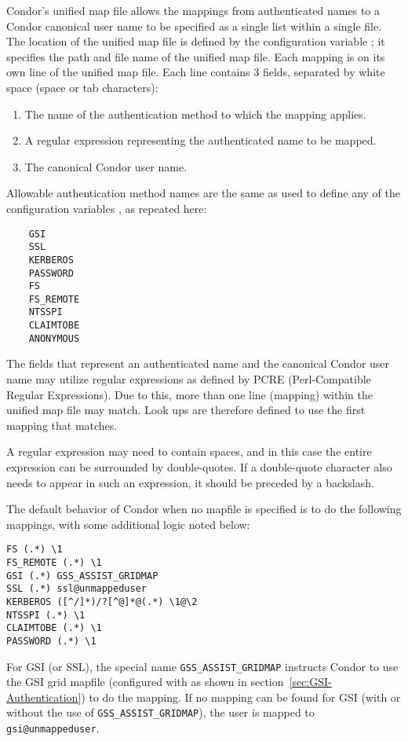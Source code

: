 Condor's unified map file allows the mappings
from authenticated names to a Condor canonical user name
to be specified as a single list within a single file. 
The location of the unified map file is defined 
by the configuration variable
; it specifies the
path and file name of the unified map file.
Each mapping is on its own line of the unified map file.
Each line contains 3 fields, separated by white space 
(space or tab characters):
\begin{enumerate}
\item{The name of the authentication method to which the mapping applies.}
\item{A regular expression representing the authenticated name
to be mapped.}
\item{The canonical Condor user name.}
\end{enumerate}

Allowable authentication method names are the same as used to define
any of the configuration variables ,
as repeated here:
\begin{verbatim}
    GSI
    SSL
    KERBEROS
    PASSWORD
    FS
    FS_REMOTE
    NTSSPI
    CLAIMTOBE
    ANONYMOUS
\end{verbatim}

The fields that represent an authenticated name and the canonical
Condor user name may utilize regular expressions as defined 
by PCRE (Perl-Compatible Regular Expressions).
Due to this, more than one line (mapping) within the unified
map file may match.
Look ups are therefore defined to use the first mapping that
matches.

A regular expression may need to contain spaces, and in this case the
entire expression can be surrounded by double-quotes. If a
double-quote character also needs to appear in such an expression, it
should be preceded by a backslash.

The default behavior of Condor when no mapfile is specified is to
do the following mappings, with some additional logic noted below:
\begin{verbatim}
FS (.*) \1
FS_REMOTE (.*) \1
GSI (.*) GSS_ASSIST_GRIDMAP
SSL (.*) ssl@unmappeduser
KERBEROS ([^/]*)/?[^@]*@(.*) \1@\2
NTSSPI (.*) \1
CLAIMTOBE (.*) \1
PASSWORD (.*) \1
\end{verbatim}

For GSI (or SSL), the special name \verb|GSS_ASSIST_GRIDMAP| instructs Condor
to use the GSI grid mapfile (configured with 
as shown in section~\ref{sec:GSI-Authentication}) to do the mapping.
If no mapping can be found for GSI (with or without the use of
\verb|GSS_ASSIST_GRIDMAP|), the user is mapped to \verb|gsi@unmappeduser|.

